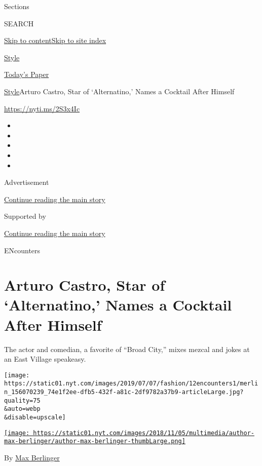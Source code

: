 Sections

SEARCH

\protect\hyperlink{site-content}{Skip to
content}\protect\hyperlink{site-index}{Skip to site index}

\href{https://www.nytimes.com/section/style}{Style}

\href{https://myaccount.nytimes.com/auth/login?response_type=cookie\&client_id=vi}{}

\href{https://www.nytimes.com/section/todayspaper}{Today's Paper}

\href{/section/style}{Style}\textbar{}Arturo Castro, Star of
`Alternatino,' Names a Cocktail After Himself

\href{https://nyti.ms/2S3x4Ic}{https://nyti.ms/2S3x4Ic}

\begin{itemize}
\item
\item
\item
\item
\item
\end{itemize}

Advertisement

\protect\hyperlink{after-top}{Continue reading the main story}

Supported by

\protect\hyperlink{after-sponsor}{Continue reading the main story}

ENcounters

\hypertarget{arturo-castro-star-of-alternatino-names-a-cocktail-after-himself}{%
\section{Arturo Castro, Star of `Alternatino,' Names a Cocktail After
Himself}\label{arturo-castro-star-of-alternatino-names-a-cocktail-after-himself}}

The actor and comedian, a favorite of ``Broad City,'' mixes mezcal and
jokes at an East Village speakeasy.

\texttt{[image: https://static01.nyt.com/images/2019/07/07/fashion/12encounters1/merlin\_156070239\_74e1f2ee-dfb5-432f-a81c-2df9782a37b9-articleLarge.jpg?quality=75\\\&auto=webp\\\&disable=upscale]}

\href{https://www.nytimes.com/by/max-berlinger}{\texttt{[image: https://static01.nyt.com/images/2018/11/05/multimedia/author-max-berlinger/author-max-berlinger-thumbLarge.png]}}

By \href{https://www.nytimes.com/by/max-berlinger}{Max Berlinger}

